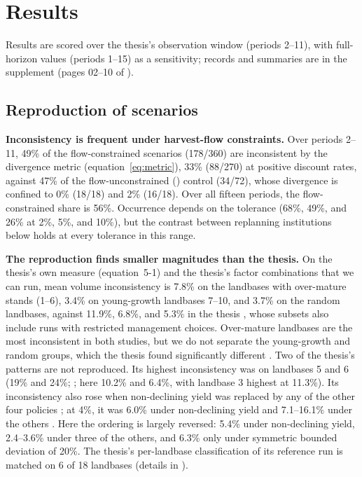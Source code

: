 \section{Results}

Results are scored over the thesis's observation window (periods 2--11), with full-horizon values (periods 1--15) as a sensitivity; records and summaries are in the supplement (pages 02--10 of ).

\subsection{Reproduction of scenarios}\label{reproduction-of-scenarios}

\textbf{Inconsistency is frequent under harvest-flow constraints.} Over periods 2--11, 49\% of the flow-constrained scenarios (178/360) are inconsistent by the divergence metric (equation~\eqref{eq:metric}), 33\% (88/270) at positive discount rates, against 47\% of the flow-unconstrained () control (34/72), whose divergence is confined to 0\% (18/18) and 2\% (16/18). Over all fifteen periods, the flow-constrained share is 56\%. Occurrence depends on the tolerance (68\%, 49\%, and 26\% at 2\%, 5\%, and 10\%), but the contrast between replanning institutions below holds at every tolerance in this range.

\textbf{The reproduction finds smaller magnitudes than the thesis.} On the thesis's own measure (equation~5-1) and the thesis's factor combinations that we can run, mean volume inconsistency is 7.8\% on the landbases with over-mature stands (1--6), 3.4\% on young-growth landbases 7--10, and 3.7\% on the random landbases, against 11.9\%, 6.8\%, and 5.3\% in the thesis \citep[Table~6.2]{daugherty1991credibility}, whose subsets also include runs with restricted management choices. Over-mature landbases are the most inconsistent in both studies, but we do not separate the young-growth and random groups, which the thesis found significantly different \citep[p.~100]{daugherty1991credibility}. Two of the thesis's patterns are not reproduced. Its highest inconsistency was on landbases 5 and 6 (19\% and 24\%; \citealp[pp.~118, 125]{daugherty1991credibility}; here 10.2\% and 6.4\%, with landbase 3 highest at 11.3\%). Its inconsistency also rose when non-declining yield was replaced by any of the other four policies \citep[p.~111]{daugherty1991credibility}; at 4\%, it was 6.0\% under non-declining yield and 7.1--16.1\% under the others \citep[Table~6.8]{daugherty1991credibility}. Here the ordering is largely reversed: 5.4\% under non-declining yield, 2.4--3.6\% under three of the others, and 6.3\% only under symmetric bounded deviation of 20\%. The thesis's per-landbase classification of its reference run \citep[p.~124]{daugherty1991credibility} is matched on 6 of 18 landbases (details in ).

